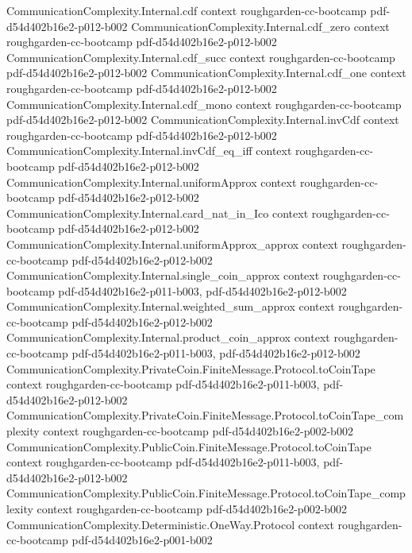 \begin{theorem}
\proofstep
  {CommunicationComplexity.Internal.cdf}
  {context}
  {roughgarden-cc-bootcamp}
  {pdf-d54d402b16e2-p012-b002}
\proofstep
  {CommunicationComplexity.Internal.cdf_zero}
  {context}
  {roughgarden-cc-bootcamp}
  {pdf-d54d402b16e2-p012-b002}
\proofstep
  {CommunicationComplexity.Internal.cdf_succ}
  {context}
  {roughgarden-cc-bootcamp}
  {pdf-d54d402b16e2-p012-b002}
\proofstep
  {CommunicationComplexity.Internal.cdf_one}
  {context}
  {roughgarden-cc-bootcamp}
  {pdf-d54d402b16e2-p012-b002}
\proofstep
  {CommunicationComplexity.Internal.cdf_mono}
  {context}
  {roughgarden-cc-bootcamp}
  {pdf-d54d402b16e2-p012-b002}
\proofstep
  {CommunicationComplexity.Internal.invCdf}
  {context}
  {roughgarden-cc-bootcamp}
  {pdf-d54d402b16e2-p012-b002}
\proofstep
  {CommunicationComplexity.Internal.invCdf_eq_iff}
  {context}
  {roughgarden-cc-bootcamp}
  {pdf-d54d402b16e2-p012-b002}
\proofstep
  {CommunicationComplexity.Internal.uniformApprox}
  {context}
  {roughgarden-cc-bootcamp}
  {pdf-d54d402b16e2-p012-b002}
\proofstep
  {CommunicationComplexity.Internal.card_nat_in_Ico}
  {context}
  {roughgarden-cc-bootcamp}
  {pdf-d54d402b16e2-p012-b002}
\proofstep
  {CommunicationComplexity.Internal.uniformApprox_approx}
  {context}
  {roughgarden-cc-bootcamp}
  {pdf-d54d402b16e2-p012-b002}
\proofstep
  {CommunicationComplexity.Internal.single_coin_approx}
  {context}
  {roughgarden-cc-bootcamp}
  {pdf-d54d402b16e2-p011-b003,
    pdf-d54d402b16e2-p012-b002}
\proofstep
  {CommunicationComplexity.Internal.weighted_sum_approx}
  {context}
  {roughgarden-cc-bootcamp}
  {pdf-d54d402b16e2-p012-b002}
\proofstep
  {CommunicationComplexity.Internal.product_coin_approx}
  {context}
  {roughgarden-cc-bootcamp}
  {pdf-d54d402b16e2-p011-b003,
    pdf-d54d402b16e2-p012-b002}
\proofstep
  {CommunicationComplexity.PrivateCoin.FiniteMessage.Protocol.toCoinTape}
  {context}
  {roughgarden-cc-bootcamp}
  {pdf-d54d402b16e2-p011-b003,
    pdf-d54d402b16e2-p012-b002}
\proofstep
  {CommunicationComplexity.PrivateCoin.FiniteMessage.Protocol.toCoinTape_complexity}
  {context}
  {roughgarden-cc-bootcamp}
  {pdf-d54d402b16e2-p002-b002}
\proofstep
  {CommunicationComplexity.PublicCoin.FiniteMessage.Protocol.toCoinTape}
  {context}
  {roughgarden-cc-bootcamp}
  {pdf-d54d402b16e2-p011-b003,
    pdf-d54d402b16e2-p012-b002}
\proofstep
  {CommunicationComplexity.PublicCoin.FiniteMessage.Protocol.toCoinTape_complexity}
  {context}
  {roughgarden-cc-bootcamp}
  {pdf-d54d402b16e2-p002-b002}
\proofstep
  {CommunicationComplexity.Deterministic.OneWay.Protocol}
  {context}
  {roughgarden-cc-bootcamp}
  {pdf-d54d402b16e2-p001-b002}

\end{theorem}

